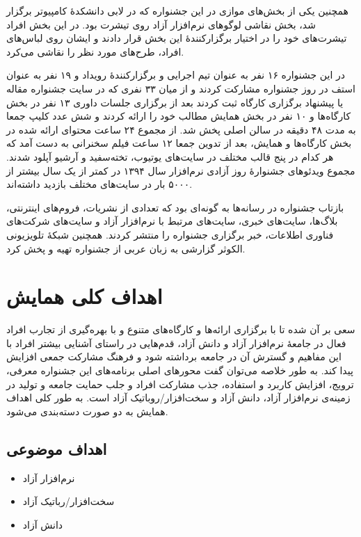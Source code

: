\documentclass{article}
\begin{document}
همچنین یکی از بخش‌های موازی در این جشنواره که در لابی دانشکدهٔ کامپیوتر برگزار شد، بخش نقاشی لوگوهای نرم‌افزار آزاد روی تیشرت بود. در این بخش افراد تیشرت‌های خود را در اختیار برگزارکنندهٔ این بخش قرار دادند و ایشان روی لباس‌های افراد، طرح‌های مورد نظر را نقاشی می‌کرد.

در این جشنواره ۱۶ نفر به عنوان تیم اجرایی و برگزارکنندهٔ رویداد و ۱۹ نفر به عنوان استف در روز جشنواره مشارکت کردند و از میان ۳۳ نفری که در سایت جشنواره مقاله یا پیشنهاد برگزاری کارگاه ثبت کردند بعد از برگزاری جلسات داوری ۱۳ نفر در بخش کارگاه‌ها و ۱۰ نفر در بخش همایش مطالب خود را ارائه کردند و شش عدد کلیپ جمعا به مدت ۴۸ دقیقه در سالن اصلی پخش شد. از مجموع ۲۴ ساعت محتوای ارائه شده در بخش کارگاه‌ها و همایش، بعد از تدوین جمعا ۱۲ ساعت فیلم سخنرانی به دست آمد که هر کدام در پنج قالب مختلف در سایت‌های یوتیوب، تخته‌سفید و آرشیو آپلود شدند. مجموع ویدئوهای جشنوارهٔ روز آزادی نرم‌افزار سال ۱۳۹۴ در کمتر از یک سال بیشتر از ۵۰۰۰ بار در سایت‌های مختلف بازدید داشته‌اند.

بازتاب جشنواره در رسانه‌ها به گونه‌ای بود که تعدادی از نشریات، فروم‌های اینترنتی، بلاگ‌ها، سایت‌های خبری، سایت‌های مرتبط با نرم‌افزار آزاد و سایت‌های شرکت‌های فناوری اطلاعات، خبر برگزاری جشنواره را منتشر کردند. همچنین شبکهٔ تلویزیونی الکوثر گزارشی به زبان عربی از جشنواره تهیه و پخش کرد.

\section{اهداف کلی همایش}
سعی بر آن شده تا با برگزاری ارائه‌ها و کارگاه‌های متنوع و با بهره‌گیری از تجارب افراد فعال در جامعهٔ نرم‌افزار آزاد و دانش آزاد، قدم‌هایی در راستای آشنایی بیشتر افراد با این مفاهیم و گسترش آن در جامعه برداشته شود و فرهنگ مشارکت جمعی افزایش پیدا کند. به طور خلاصه می‌توان گفت محورهای اصلی برنامه‌های این جشنواره معرفی، ترویج، افزایش کاربرد و استفاده، جذب مشارکت افراد و جلب حمایت جامعه و تولید در زمینه‌ی نرم‌افزار آزاد، دانش آزاد و سخت‌افزار/روباتیک آزاد است. به طور کلی اهداف همایش به دو صورت دسته‌بندی می‌شود.

\subsection{اهداف موضوعی}
\begin{flushright}

\begin{itemize}
\item نرم‌افزار آزاد
\item سخت‌افزار/رباتیک آزاد
\item دانش آزاد
\end{itemize}
\end{flushright}
\end{document}
